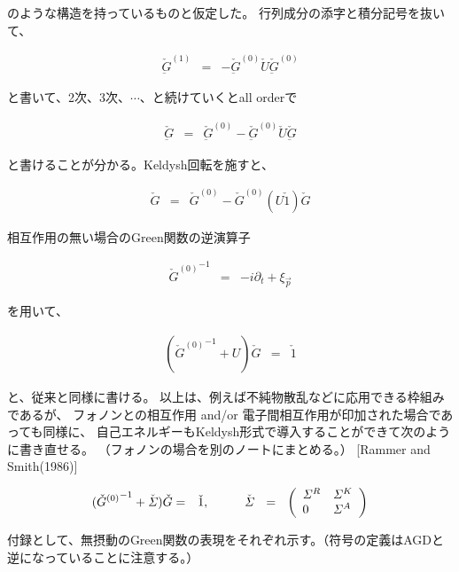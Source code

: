 \documentclass[uplatex,a4j,12pt,dvipdfmx]{jsarticle}
\begin{document}
のような構造を持っているものと仮定した。
行列成分の添字と積分記号を抜いて、

\begin{eqnarray}
	\check{\underbar{G}}^{(1)}
	&=&
	-
	\check{\underbar{G}}^{(0)}
	\check{U}
	\check{\underbar{G}}^{(0)}
\end{eqnarray}

と書いて、2次、3次、$\cdots$、と続けていくとall orderで

\begin{eqnarray}
	\check{\underbar{G}}
	&=&
	\check{\underbar{G}}^{(0)}
	-
	\check{\underbar{G}}^{(0)}
	\check{U}
	\check{\underbar{G}}
\end{eqnarray}

と書けることが分かる。Keldysh回転を施すと、

\begin{eqnarray}
	\check{G}
	&=&
	\check{G}^{(0)}
	-
	\check{G}^{(0)}
	(U \check{1})
	\check{G}
\end{eqnarray}

相互作用の無い場合のGreen関数の逆演算子

\begin{eqnarray}
	{{\check{G}}^{(0)}{}}^{-1}
	&=&
	- i \partial_{t} + \xi_{\vec{p}}
\end{eqnarray}

を用いて、

\begin{eqnarray}
	({{\check{G}}^{(0)}{}}^{-1} + U ) \check{G}
	&=&
	\check{1}
\end{eqnarray}

と、従来と同様に書ける。
以上は、例えば不純物散乱などに応用できる枠組みであるが、
フォノンとの相互作用 and/or 電子間相互作用が印加された場合であっても同様に、
自己エネルギーもKeldysh形式で導入することができて次のように書き直せる。
（フォノンの場合を別のノートにまとめる。）
[Rammer and Smith(1986)]

\begin{eqnarray}
	({{\check{G}}^{(0)}{}}^{-1} + \check{\mathit{\Sigma}} ) \check{G}
	&=&
	\check{1}
	,
	\hspace{10mm}
	\check{\mathit{\Sigma}}
	\ \ = \ \
	\left(
	\begin{array}{ll}
			\mathit{\Sigma}^{R} & \mathit{\Sigma}^{K}
			\\
			0                   & \mathit{\Sigma}^{A}
		\end{array}
	\right)
\end{eqnarray}


付録として、無摂動のGreen関数の表現をそれぞれ示す。（符号の定義はAGDと逆になっていることに注意する。）
\end{document}
